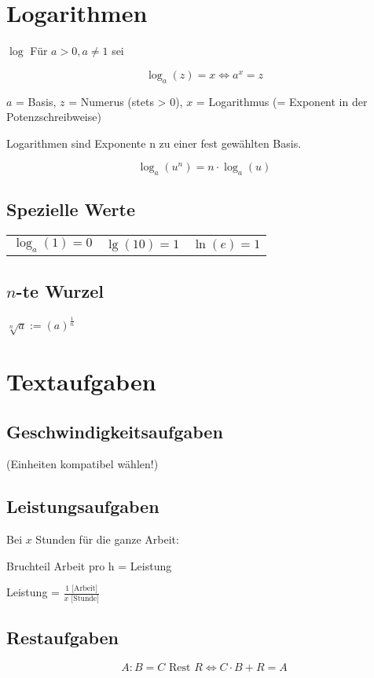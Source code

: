 \begin{multicols}{2}
\section{Logarithmen}

\begin{definition}{$\log$}{}
Für $a>0, a\ne 1$ sei

$$\log_a{}(z)=x \Longleftrightarrow{} a^x = z$$
\end{definition}
$a$ = Basis, $z$ = Numerus (stets > 0), $x$ = Logarithmus (= Exponent in der Potenzschreibweise)

Logarithmen sind Exponente n zu einer fest gewählten Basis.

\begin{gesetz}{}{}
$$\log_a(u^n) = n\cdot{}\log_a(u)$$
\end{gesetz}

\subsection{Spezielle Werte}
\begin{tabular}{ccc}
$\log_a(1)=0$ & $\lg(10) = 1$ & $\ln(e) = 1$
\end{tabular} 

\subsection{$n$-te Wurzel}
$\sqrt[n]{a} := \left(a\right)^\frac1n$

\section{Textaufgaben}

\subsection{Geschwindigkeitsaufgaben}
 (Einheiten kompatibel wählen!)

\subsection{Leistungsaufgaben}
Bei $x$ Stunden für die ganze Arbeit:

Bruchteil Arbeit pro h = Leistung

Leistung = $\frac{1 \textrm{ [Arbeit]}}{x \textrm{ [Stunde]}}$

\subsection{Restaufgaben}
$$A:B = C \textrm{ Rest } R \Longleftrightarrow{}  C\cdot{}B+R = A$$


\end{multicols}

